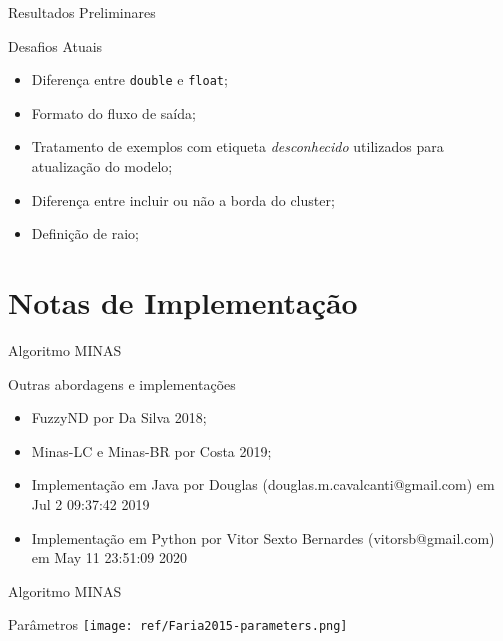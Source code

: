 \documentclass[aspectratio=43,10pt]{beamer}
\begin{document}
\begin{frame}[fragile]{Resultados Preliminares}
  \begin{alertblock}{Desafios Atuais}
    \begin{itemize}
      \item Diferença entre \texttt{double} e \texttt{float};
      \item Formato do fluxo de saída;
      \item Tratamento de exemplos com etiqueta \textit{desconhecido} utilizados
      para atualização do modelo;
      \item Diferença entre incluir ou não a borda do cluster;
      \item Definição de raio;
    \end{itemize}
  \end{alertblock}
\end{frame}


\section{Notas de Implementação}

\begin{frame}[fragile]{Algoritmo MINAS}
  \begin{alertblock}{Outras abordagens e implementações}
    \begin{itemize}%
      \item FuzzyND por Da Silva 2018;
      \item Minas-LC e Minas-BR por Costa 2019;
      \item Implementação em Java por Douglas (douglas.m.cavalcanti@gmail.com) em Jul 2 09:37:42 2019
      \item Implementação em Python por Vitor Sexto Bernardes (vitorsb@gmail.com) em May 11 23:51:09 2020
    \end{itemize}
  \end{alertblock}
\end{frame}

\begin{frame}[fragile]{Algoritmo MINAS}
  \begin{alertblock}{Parâmetros}
    \texttt{[image: ref/Faria2015-parameters.png]}
  \end{alertblock}
\end{frame}
\end{document}
